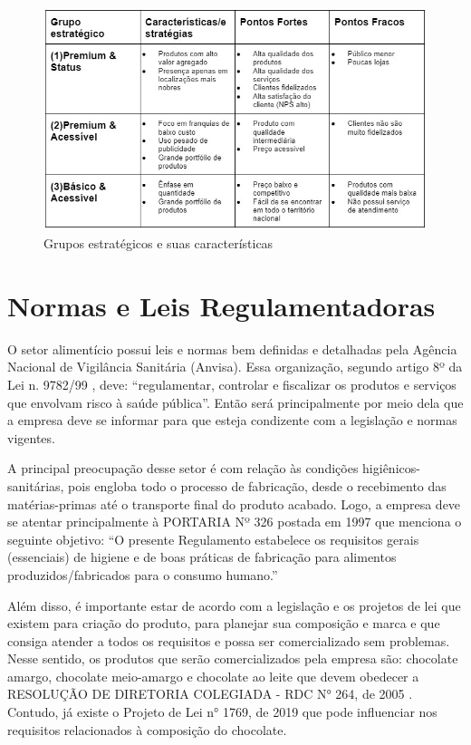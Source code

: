 \documentclass[
	12pt,				%
	openright,			%
	oneside,			%
	a4paper,			%
	english,			%
	french,				%
	spanish,			%
	brazil				%
	]{abntex2}
\begin{document}
\begin{figure}[H]
\begin{center}
\caption{Grupos estratégicos e suas características}
\includegraphics[scale=0.5]{WhatsApp Image 2022-08-19 at 18.59.03.jpeg} 
\end{center}
\end{figure}

\newpage
\chapter{Normas e Leis Regulamentadoras}

O setor alimentício possui leis e normas bem definidas e detalhadas pela Agência Nacional de Vigilância Sanitária (Anvisa). Essa organização, segundo artigo 8º da Lei n. 9782/99 \cite{anvisa9782}, deve: “regulamentar, controlar e fiscalizar os produtos e serviços que envolvam risco à saúde pública”. Então será principalmente por meio dela que a empresa deve se informar para que esteja condizente com a legislação e normas vigentes. 

A principal preocupação desse setor é com relação às condições higiênicos-sanitárias, pois engloba todo o processo de fabricação, desde o recebimento das matérias-primas até o transporte final do produto acabado. Logo, a empresa deve se atentar principalmente à PORTARIA Nº 326 postada em 1997 \cite{anvisa326} que menciona o seguinte objetivo: “O presente Regulamento estabelece os requisitos gerais (essenciais) de higiene e de boas práticas de fabricação para alimentos produzidos/fabricados para o consumo humano.” 

Além disso, é importante estar de acordo com a legislação e os projetos de lei que existem para criação do produto, para planejar sua composição e marca e que consiga atender a todos os requisitos e possa ser comercializado sem problemas. Nesse sentido, os produtos que serão comercializados pela empresa são: chocolate amargo, chocolate meio-amargo e chocolate ao leite que devem obedecer a RESOLUÇÃO DE DIRETORIA COLEGIADA - RDC N° 264, de 2005 \cite{anvisa264}. Contudo, já existe o Projeto de Lei n° 1769, de 2019 \cite{anvisa1769} que pode influenciar nos requisitos relacionados à composição do chocolate.  
\end{document}
